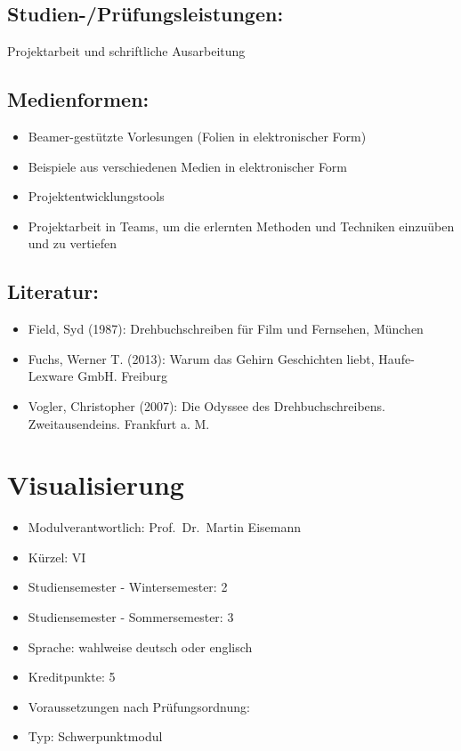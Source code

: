\section*{Studien-/Prüfungsleistungen:}\label{studien-pruxfcfungsleistungen-17}

Projektarbeit und schriftliche Ausarbeitung

\section*{Medienformen:}\label{medienformen-17}

\begin{itemize}
\item
  Beamer-gestützte Vorlesungen (Folien in elektronischer Form)
\item
  Beispiele aus verschiedenen Medien in elektronischer Form
\item
  Projektentwicklungstools
\item
  Projektarbeit in Teams, um die erlernten Methoden und Techniken
  einzuüben und zu vertiefen
\end{itemize}

\section*{Literatur:}\label{literatur-14}

\begin{itemize}
\item
  Field, Syd (1987): Drehbuchschreiben für Film und Fernsehen, München
\item
  Fuchs, Werner T. (2013): Warum das Gehirn Geschichten liebt,
  Haufe-Lexware GmbH. Freiburg
\item
  Vogler, Christopher (2007): Die Odyssee des Drehbuchschreibens.
  Zweitausendeins. Frankfurt a. M.
\end{itemize}

\chapter{Visualisierung}\label{visualisierung}

\begin{itemize}
\tightlist
\item
  Modulverantwortlich: Prof.~Dr.~Martin Eisemann
\item
  Kürzel: VI
\item
  Studiensemester - Wintersemester: 2
\item
  Studiensemester - Sommersemester: 3
\item
  Sprache: wahlweise deutsch oder englisch
\item
  Kreditpunkte: 5
\item
  Voraussetzungen nach Prüfungsordnung: ~
\item
  Typ: Schwerpunktmodul
\end{itemize}

